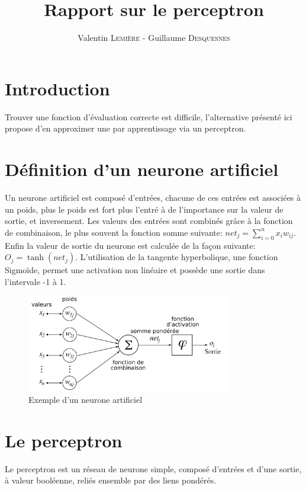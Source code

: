 \documentclass[a4paper]{article}
\title{Rapport sur le perceptron}
\author{Valentin \textsc{Lemière} - Guillaume \textsc{Desquesnes}}
\date{}
\begin{document}
\maketitle

\section{Introduction}
	Trouver une fonction d'évaluation correcte est difficile, l'alternative présenté
	ici propose d'en approximer une par apprentissage via un perceptron.

\section{Définition d'un neurone artificiel}
	Un neurone artificiel est composé d'entrées, chacune de ces entrées est associées
	à un poids, plus le poids est fort plus l'entré à de l'importance sur la valeur de
	sortie, et inversement. Les valeurs des entrées sont combinés grâce à la fonction de
	combinaison, le plus souvent la fonction somme suivante: $net_j = \sum\limits_{i=0}^n x_i  w_{ij}$.
	Enfin la valeur de sortie du neurone est calculée de la façon suivante: $O_j = \tanh{}(net_j)$.
	L'utilisation de la tangente hyperbolique, une fonction Sigmoïde, permet une activation non linéaire
	et possède une sortie dans l'intervale -1 à 1.

	\begin{figure}[h]
		\centering
		\includegraphics[width=0.8\textwidth]{ArtificialNeuronModel_francais.png}
		\caption{Exemple d'un neurone artificiel}
		\label{fig:plateau_de_gyges}
	\end{figure}

\section{Le perceptron}
	Le perceptron est un réseau de neurone simple, composé d'entrées et d'une sortie, à valeur
	booléenne, reliés ensemble par des liens pondérés.
\end{document}
